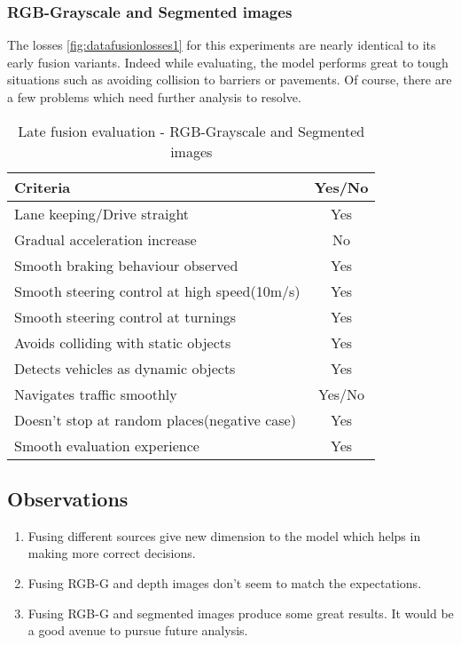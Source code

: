 \subsubsection*{RGB-Grayscale and Segmented images}
The losses \ref{fig:datafusionlosses1} for this experiments are nearly identical to its early fusion variants.
Indeed while evaluating, the model performs great to tough situations such as avoiding
collision to barriers or pavements. Of course, there are a few problems which need further
analysis to resolve.
\begin{table}[!ht]
    \centering
\begin{tabular}{lc}
    \toprule
    Criteria  & Yes/No \\\midrule
    Lane keeping/Drive straight  & Yes  \\
    Gradual acceleration increase  & No\\
    Smooth braking behaviour observed & Yes \\
    Smooth steering control at high speed(10m/s) & Yes \\
    Smooth steering control at turnings & Yes\\
    Avoids colliding with static objects & Yes \\
    Detects vehicles as dynamic objects & Yes \\
    Navigates traffic smoothly & Yes/No\\
    Doesn't stop at random places(negative case) & Yes \\
    Smooth evaluation experience & Yes \\\bottomrule
\end{tabular}
\caption{Late fusion evaluation - RGB-Grayscale and Segmented images}
\label{table:latefusionrgbseg}
\end{table}
\subsection*{Observations}
\begin{enumerate}
    \item Fusing different sources give new dimension to the model which helps in making
        more correct decisions.
    \item Fusing RGB-G and depth images don't seem to match the expectations.
    \item Fusing RGB-G and segmented images produce some great results. It would be a
        good avenue to pursue future analysis.
\end{enumerate}
